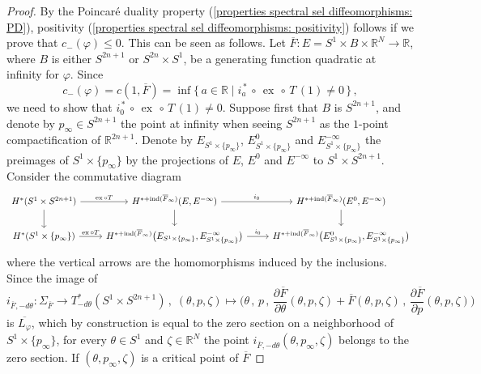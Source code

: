 \documentclass{amsart}
\DeclareMathOperator{\ex}{ex}
\DeclareMathOperator{\ind}{ind}
\theoremstyle{remark}
\begin{document}
\begin{proof}
By the Poincar\'e duality property
(\ref{properties spectral sel diffeomorphisms: PD}),
positivity (\ref{properties spectral sel diffeomorphisms: positivity})
follows if we prove that $c_- (\varphi) \leq 0$.
This can be seen as follows.
Let $\overline{F}: E = S^1 \times B \times \mathbb{R}^N \rightarrow \mathbb{R}$,
where $B$ is either $S^{2n+1}$ or $S^{2n} \times S^1$,
be a generating function quadratic at infinity for $\varphi$.
Since
\[
c_- (\varphi) = c (1, \overline{F})
= \inf \{\, a \in \mathbb{R} \;\lvert\; i_a^{\,\ast} \,\circ\, \ex \,\circ\, T \, (1) \neq 0 \,\} \,,
\]
we need to show that $i_0^{\,\ast} \,\circ\, \ex \,\circ\, T \, (1) \neq 0$.
Suppose first that $B$ is $S^{2n+1}$,
and denote by $p_{\infty} \in S^{2n+1}$
the point at infinity 
when seeing $S^{2n+1}$ as the $1$-point compactification of $\mathbb{R}^{2n+1}$.
Denote by $E_{S^1 \times \{p_{\infty}\}}$,
$E^0_{S^1 \times \{p_{\infty}\}}$ and $E^{-\infty}_{S^1 \times \{p_{\infty}\}}$
the preimages of $S^1 \times \{p_{\infty}\}$
by the projections of $E$, $E^0$ and $E^{-\infty}$
to $S^1 \times S^{2n+1}$.
Consider the commutative diagram
\[
\begin{tikzcd}
H^{\ast} (S^1 \times S^{2n+1})
\arrow{r}{\ex \circ T} \arrow{d}
& H^{\ast + \ind (\overline{F}_{\infty})} (E, E^{-\infty})
\arrow{r}{i_0} \arrow{d}
&  H^{\ast + \ind (\overline{F}_{\infty})} (E^0, E^{-\infty})
\arrow{d}\\
H^{\ast} (S^1 \times \{p_{\infty}\})
\arrow{r}{\ex \circ T}
& H^{\ast + \ind (\overline{F}_{\infty})}
\big(E_{S^1 \times \{p_{\infty}\}}, E_{S^1 \times \{p_{\infty}\}}^{-\infty}\big)
\arrow{r}{i_0}
&  H^{\ast + \ind (\overline{F}_{\infty})}
\big(E_{S^1 \times \{p_{\infty}\}}^0, E_{S^1 \times \{p_{\infty}\}}^{-\infty}\big)
\end{tikzcd}
\]
where the vertical arrows are the homomorphisms induced by the inclusions.
Since the image of
\[
i_{\overline{F}, -d\theta}: \Sigma_{\overline{F}}
\rightarrow T^{\ast}_{-d\theta} (S^1 \times S^{2n+1}) \,,\;
(\theta, p, \zeta) \mapsto
\Big( \theta \,,\, p \,,\,
\frac{\partial \overline{F}}{\partial \theta} (\theta, p, \zeta) + \overline{F} (\theta, p, \zeta)
\,,\, \frac{\partial \overline{F}}{\partial p} (\theta, p, \zeta) \Big)
\]
is $\overline{L_{\varphi}}$,
which by construction is equal to the zero section
on a neighborhood of $S^1 \times \{p_{\infty}\}$,
for every $\theta \in S^1$ and $\zeta \in \mathbb{R}^N$
the point $i_{\overline{F}, -d\theta} (\theta, p_{\infty}, \zeta)$
belongs to the zero section.
If $(\theta, p_{\infty}, \zeta)$ is a critical point of $\overline{F}$

\end{proof}
\end{document}
